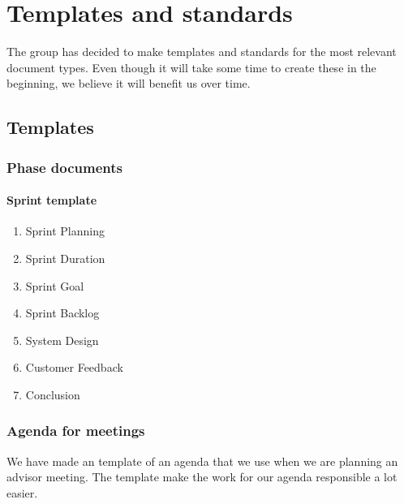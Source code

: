 \section{Templates and standards}
The group has decided to make templates and standards for the most relevant document types. Even though it will take some time to create these in the beginning, we believe it will benefit us over time.

\subsection{Templates}

\subsubsection{Phase documents}

\paragraph{Sprint template}\hfill
\begin{enumerate}
\item{}Sprint Planning
\item{}Sprint Duration
\item{}Sprint Goal
\item{}Sprint Backlog
\item{}System Design
\item{}Customer Feedback
\item{}Conclusion
\end{enumerate}

\subsubsection{Agenda for meetings}
We have made an template of an agenda that we use when we are planning an advisor meeting. The template make the work for our agenda responsible a lot easier.


